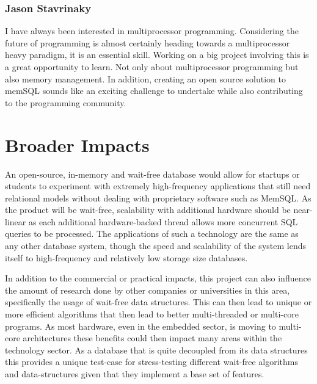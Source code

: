 \documentclass[letterpaper, 12pt]{article}
\begin{document}
\subsubsection{Jason Stavrinaky}
I have always been interested in multiprocessor programming.  Considering the
future  of  programming  is  almost  certainly  heading  towards  a  multiprocessor
heavy paradigm, it is an essential skill.  Working on a big project involving this
is a great opportunity to learn.  Not only about multiprocessor programming
but also memory management.  In addition, creating an open source solution to
memSQL sounds like an exciting challenge to undertake while also contributing
to the programming community.

\newpage

\section{Broader Impacts}
An open-source, in-memory and wait-free database would allow for startups or students to
experiment with extremely high-frequency applications that still need relational
models without dealing with proprietary software such as MemSQL. As the product
will be wait-free, scalability with additional hardware should be near-linear as each
additional hardware-backed thread allows more concurrent SQL queries to be processed.
The applications of such a technology are the same as any other database system,
though the speed and scalability of the system lends itself to high-frequency and
relatively low storage size databases.
\par\vspace{\baselineskip}
In addition to the commercial or practical impacts, this project can also influence the
amount of research done by other companies or universities in this area, specifically the
usage of wait-free data structures. This can then lead to unique or more efficient
algorithms that then lead to better multi-threaded or multi-core programs. As most hardware,
even in the embedded sector, is moving to multi-core architectures these benefits could
then impact many areas within the technology sector. As a database that is quite decoupled
from its data structures this provides a unique test-case for stress-testing different wait-free
algorithms and data-structures given that they implement a base set of features.
\newpage
\end{document}
